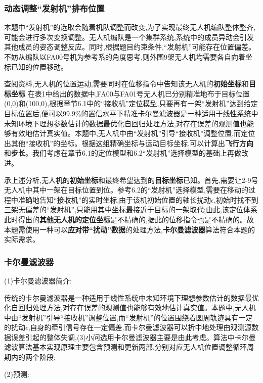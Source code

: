\documentclass[withoutpreface,bwprint]{cumcmthesis}
\begin{document}
	\subsubsection{动态调整“发射机”排布位置}
	
	本题中“发射机”的选取会随着机队调整而改变,为了实现最终无人机编队整体整齐,可能会进行多次变换调整。无人机编队是一个集群系统,系统中的成员异动会引发其他成员的姿态调整反应。同时,根据题目约束条件,“发射机”可能存在位置偏差。不妨从编队以FA00号机为参考系的角度思考,则外围9架无人机均需要各自向着坐标已知的位置移动。
	
	查阅资料,无人机的位置运动,需要同时在位移指令中告知该无人机的\textbf{初始坐标}和\textbf{目标坐标}
	在表1中给出的数据中,FA00与FA01号无人机已分别精准地布于目标位置(0,0)和(100,0),根据章节6.1中的“接收机”定位模型,只要再有一架“发射机”达到给定目标位置后,便可以99.9\%的置信水平下精准卡尔曼滤波器是一种适用于线性系统中未知环境下理想参数估计的数据最优化自回归处理方法,对存在误差的观测值也能够有效地估计真实值。本题中,无人机中由“发射机”引导“接收机”调整位置,而定位出其他“接收机”的坐标。根据这组精确坐标与运动目标坐标,可以计算出\textbf{飞行方向}和\textbf{步长}。我们考虑在章节6.1的定位模型和6.2“发射机”选择模型的基础上再做改进。
	
	承上述分析,无人机的\textbf{初始坐标}和最终希望达到的\textbf{目标坐标}已知。首先,需要让2-9号无人机中其中一架在目标位置到位。参考6.2的“发射机”选择模型,需要在移动的过程中准确地告知“接收机”的实时坐标,由于该机初始位置的轴长扰动$\epsilon$,初始时找不到三架无偏差的“发射机”,只能用其中坐标最接近于目标的一架取代;由此,该定位体系此时得出的\textbf{其他无人机的定位坐标}是不精确的,据此的位移指令也是不精确的。故本题需使用一种可以\textbf{应对带“扰动”数据}的处理方法,\textbf{卡尔曼滤波器}算法符合本题的实际需求。
	
	
	\subsubsection{卡尔曼滤波器}
	
	(1)卡尔曼滤波器简介:
	
	传统的卡尔曼滤波器是一种适用于线性系统中未知环境下理想参数估计的数据最优化自回归处理方法,对存在误差的观测值也能够有效地估计真实值。本题中,无人机中由“发射机”引导“接收机”调整位置,而“发射机”的位置围绕着圆周轨迹具有一定的扰动$\epsilon$,自身的牵引信号存在一定偏差,而卡尔曼滤波器可以折中地处理由观测源数据误差引起的整体失调,(3)小问选用卡尔曼滤波器主要是由此考虑。算法中卡尔曼滤波算法基本实现原理主要包含预测和更新两部,分别对应无人机位置调整循环周期内的两个阶段:
	
	(2)预测:
	
\end{document}
